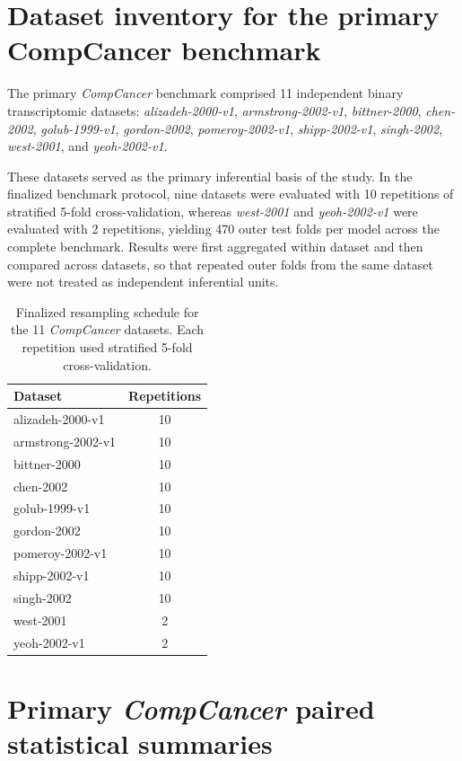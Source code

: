 \documentclass[11pt, a4paper]{article}
\newcommand{\stdtablefont}{\small}
\newcommand{\stdtablelayout}{%
  \stdtablefont
  \setlength{\tabcolsep}{4pt}
  \renewcommand{\arraystretch}{1.2}
}
\begin{document}
\section{Dataset inventory for the primary CompCancer benchmark}

The primary \emph{CompCancer} benchmark comprised 11 independent binary transcriptomic datasets:
\emph{alizadeh-2000-v1},
\emph{armstrong-2002-v1},
\emph{bittner-2000},
\emph{chen-2002},
\emph{golub-1999-v1},
\emph{gordon-2002},
\emph{pomeroy-2002-v1},
\emph{shipp-2002-v1},
\emph{singh-2002},
\emph{west-2001}, and
\emph{yeoh-2002-v1}.

These datasets served as the primary inferential basis of the study. In the finalized benchmark protocol, nine datasets were evaluated with 10 repetitions of stratified 5-fold cross-validation, whereas \emph{west-2001} and \emph{yeoh-2002-v1} were evaluated with 2 repetitions, yielding 470 outer test folds per model across the complete benchmark. Results were first aggregated within dataset and then compared across datasets, so that repeated outer folds from the same dataset were not treated as independent inferential units.

\begin{table}[!htbp]
\centering
\caption{Finalized resampling schedule for the 11 \emph{CompCancer} datasets. Each repetition used stratified 5-fold cross-validation.}
\label{tab:compcancer_repetitions}
{\stdtablelayout
\begin{tabular}{lc}
\toprule
\textbf{Dataset} & \textbf{Repetitions} \\
\midrule
alizadeh-2000-v1 & 10 \\
armstrong-2002-v1 & 10 \\
bittner-2000 & 10 \\
chen-2002 & 10 \\
golub-1999-v1 & 10 \\
gordon-2002 & 10 \\
pomeroy-2002-v1 & 10 \\
shipp-2002-v1 & 10 \\
singh-2002 & 10 \\
west-2001 & 2 \\
yeoh-2002-v1 & 2 \\
\bottomrule
\end{tabular}
}
\end{table}

\section{Primary \emph{CompCancer} paired statistical summaries}
\end{document}
